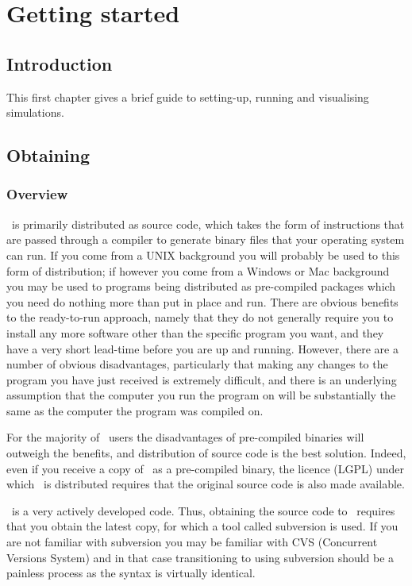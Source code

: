\chapter{Getting started}\label{chap:gettingstarted}

\section{Introduction}
This first chapter gives a brief guide to setting-up, running and visualising
simulations.

\section{Obtaining \fluidity}
\label{sect:obtaining_fluidity}

\subsection{Overview}
\label{sect:obtaining_fluidity_overview}

\fluidity\ is primarily distributed as source code, which takes the form of
instructions that are passed through a compiler to generate binary files that
your operating system can run. If you come from a UNIX background you will
probably be used to this form of distribution; if however you come from a
Windows or Mac background you may be used to programs being distributed as
pre-compiled packages which you need do nothing more than put in place and run.
There are obvious benefits to the ready-to-run approach, namely that they do
not generally require you to install any more software other than the specific
program you want, and they have a very short lead-time before you are up and
running. However, there are a number of obvious disadvantages, particularly that
making any changes to the program you have just received is extremely
difficult, and there is an underlying assumption that the computer you run the
program on will be substantially the same as the computer the program was
compiled on.

For the majority of \fluidity\ users the disadvantages of pre-compiled binaries
will outweigh the benefits, and distribution of source code is the best
solution. Indeed, even if you receive a copy of \fluidity\ as a pre-compiled
binary, the licence (LGPL) under which \fluidity\ is distributed requires that
the original source code is also made available.

\fluidity\ is a very actively developed code. Thus, obtaining the source code to
\fluidity\ requires that you obtain the latest copy, for which a tool called
subversion is used. If you are not familiar with subversion you may be
familiar with CVS (Concurrent Versions System) and in that case transitioning
to using subversion should be a painless process as the syntax is virtually
identical.


